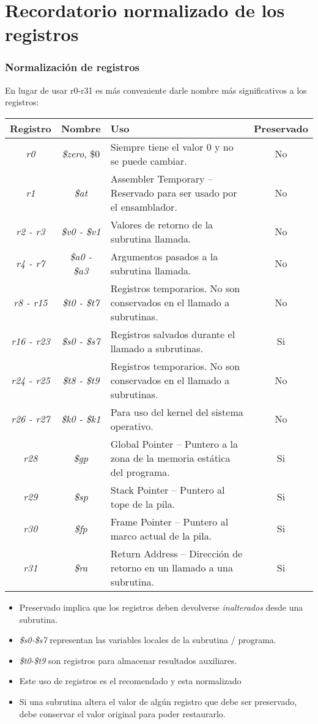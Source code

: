 \documentclass{beamer}
\begin{document}
\section{Recordatorio normalizado de los registros}
\begin{frame}
\frametitle{Normalización de registros}
En lugar de usar r0-r31 es más conveniente darle nombre más significativos a los registros:
\tiny{
\begin{tabular}{| c | c | p{6.5cm} | c |}
\hline
Registro & Nombre & Uso & Preservado \\ \hline
\emph{r0} & \emph{\$zero}, {\$0} & Siempre tiene el valor 0 y no se puede cambiar. & No \\ \hline
\emph{r1} & \emph{\$at} & Assembler Temporary – Reservado para ser usado por el ensamblador. & No \\ \hline
\emph{r2 - r3} & \emph{\$v0 - \$v1} & Valores de retorno de la subrutina llamada. & No \\ \hline
\emph{r4 - r7} & \emph{\$a0 - \$a3} & Argumentos pasados a la subrutina llamada. & No \\ \hline
\emph{r8 - r15} & \emph{\$t0 - \$t7} & Registros temporarios. No son conservados en el llamado a subrutinas. & No \\ \hline
\emph{r16 - r23} & \emph{\$s0 - \$s7} &  Registros salvados durante el llamado a subrutinas. & Si \\ \hline
\emph{r24 - r25} & \emph{\$t8 - \$t9} & Registros temporarios. No son conservados en el llamado a subrutinas. & No \\ \hline
\emph{r26 - r27} & \emph{\$k0 - \$k1} & Para uso del kernel del sistema operativo. & No \\ \hline
\emph{r28} & \emph{\$gp} & Global Pointer – Puntero a la zona de la memoria estática del programa. & Si \\ \hline
\emph{r29} & \emph{\$sp} & Stack Pointer – Puntero al tope de la pila. & Si \\ \hline
\emph{r30} & \emph{\$fp} & Frame Pointer – Puntero al marco actual de la pila. & Si \\ \hline
\emph{r31} & \emph{\$ra} & Return Address – Dirección de retorno en un llamado a una subrutina. & Si \\ \hline

\end{tabular}
}
\begin{itemize}
\item Preservado implica que los registros deben devolverse \emph{inalterados} desde una subrutina.
\item \emph{\$s0-\$s7} representan las variables locales de la subrutina / programa.
\item \emph{\$t0-\$t9} son registros para almacenar resultados auxiliares.
\item Este uso de registros es el recomendado y esta normalizado
\item Si una subrutina altera el valor de algún registro que debe ser preservado, debe conservar el valor original para poder restaurarlo.
\end{itemize}

\end{frame}
\end{document}
